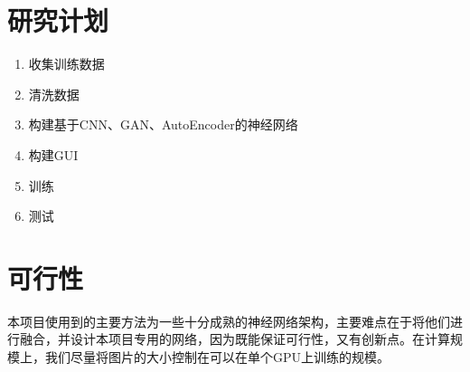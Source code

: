 \documentclass{article}
\begin{document}
\section{研究计划}

\begin{enumerate}
	\item 收集训练数据
	\item 清洗数据
	\item 构建基于CNN、GAN、AutoEncoder的神经网络
	\item 构建GUI
	\item 训练
	\item 测试
\end{enumerate}

\section{可行性}
本项目使用到的主要方法为一些十分成熟的神经网络架构，主要难点在于将他们进行融合，并设计本项目专用的网络，因为既能保证可行性，又有创新点。在计算规模上，我们尽量将图片的大小控制在可以在单个GPU上训练的规模。
\end{document}
